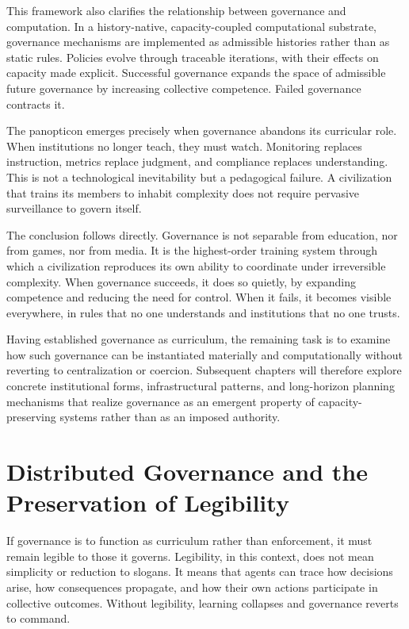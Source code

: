\documentclass[12pt,oneside]{book}
\begin{document}
This framework also clarifies the relationship between governance and computation. In a history-native, capacity-coupled computational substrate, governance mechanisms are implemented as admissible histories rather than as static rules. Policies evolve through traceable iterations, with their effects on capacity made explicit. Successful governance expands the space of admissible future governance by increasing collective competence. Failed governance contracts it.

The panopticon emerges precisely when governance abandons its curricular role. When institutions no longer teach, they must watch. Monitoring replaces instruction, metrics replace judgment, and compliance replaces understanding. This is not a technological inevitability but a pedagogical failure. A civilization that trains its members to inhabit complexity does not require pervasive surveillance to govern itself.

The conclusion follows directly. Governance is not separable from education, nor from games, nor from media. It is the highest-order training system through which a civilization reproduces its own ability to coordinate under irreversible complexity. When governance succeeds, it does so quietly, by expanding competence and reducing the need for control. When it fails, it becomes visible everywhere, in rules that no one understands and institutions that no one trusts.

Having established governance as curriculum, the remaining task is to examine how such governance can be instantiated materially and computationally without reverting to centralization or coercion. Subsequent chapters will therefore explore concrete institutional forms, infrastructural patterns, and long-horizon planning mechanisms that realize governance as an emergent property of capacity-preserving systems rather than as an imposed authority.

\chapter{Distributed Governance and the Preservation of Legibility}

If governance is to function as curriculum rather than enforcement, it must remain legible to those it governs. Legibility, in this context, does not mean simplicity or reduction to slogans. It means that agents can trace how decisions arise, how consequences propagate, and how their own actions participate in collective outcomes. Without legibility, learning collapses and governance reverts to command.
\end{document}
